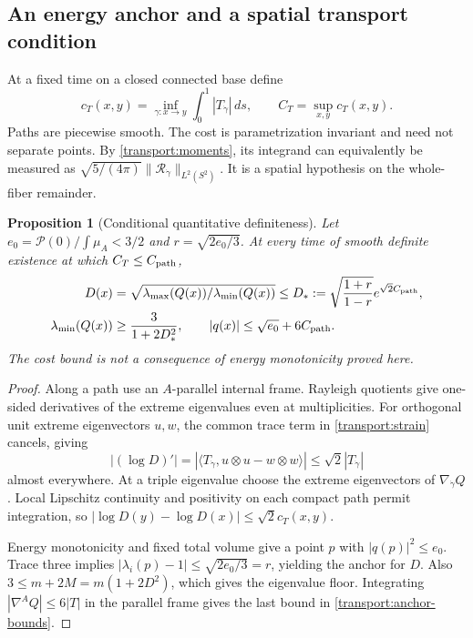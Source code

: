 \documentclass[11pt]{article}
\numberwithin{equation}{section}
\newtheorem{proposition}[theorem]{Proposition}
\theoremstyle{definition}
\theoremstyle{remark}
\begin{document}
\subsection{An energy anchor and a spatial transport condition}
\label{subsec:transport-anchor}

At a fixed time on a closed connected base define
\[
 c_T(x,y)=\inf_{\gamma:x\to y}\int_0^1|T_{\dot\gamma}|\,ds,
 \qquad C_T=\sup_{x,y}c_T(x,y).
\]
Paths are piecewise smooth. The cost is parametrization invariant and
need not separate points. By \eqref{transport:moments}, its integrand
can equivalently be measured as $\sqrt{5/(4\pi)}\|\mathcal R_{\dot\gamma}\|_{L^2(S^2)}$.
It is a spatial hypothesis on the whole-fiber remainder.

\begin{proposition}[Conditional quantitative definiteness]
\label{prop:transport-anchor}
Let $e_0=\mathcal P(0)/\int\mu_A<3/2$ and $r=\sqrt{2e_0/3}$.
At every time of smooth definite existence at which $C_T\leq C_{\rm path}$,
\begin{align}
 D(x)&=\sqrt{\lambda_{\max}(Q(x))/\lambda_{\min}(Q(x))}
       \leq D_*:=\sqrt{\frac{1+r}{1-r}}e^{\sqrt2 C_{\rm path}},\nonumber\\
 \lambda_{\min}(Q(x))&\geq\frac{3}{1+2D_*^2},\qquad
 |q(x)|\leq\sqrt{e_0}+6C_{\rm path}.
 \label{transport:anchor-bounds}
\end{align}
The cost bound is not a consequence of energy monotonicity proved here.
\end{proposition}
\begin{proof}
Along a path use an $A$-parallel internal frame. Rayleigh quotients give
one-sided derivatives of the extreme eigenvalues even at multiplicities.
For orthogonal unit extreme eigenvectors $u,w$, the common trace term in
\eqref{transport:strain} cancels, giving
\[
 |(\log D)'|=|\langle T_{\dot\gamma},u\otimes u-w\otimes w\rangle|
                  \leq\sqrt2|T_{\dot\gamma}|
\]
almost everywhere. At a triple eigenvalue choose the extreme eigenvectors
of $\nabla_{\dot\gamma}Q$. Local Lipschitz continuity and positivity on
each compact path permit integration, so
$|\log D(y)-\log D(x)|\leq\sqrt2 c_T(x,y)$.

Energy monotonicity and fixed total volume give a point $p$ with
$|q(p)|^2\leq e_0$. Trace three implies
$|\lambda_i(p)-1|\leq\sqrt{2e_0/3}=r$, yielding the anchor for $D$.
Also $3\leq m+2M=m(1+2D^2)$, which gives the eigenvalue floor.
Integrating $|\nabla^A Q|\leq6|T|$ in the parallel frame gives the last
bound in \eqref{transport:anchor-bounds}.
\end{proof}
\end{document}
